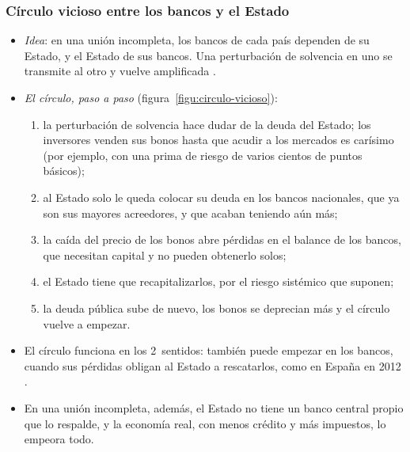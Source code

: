 \documentclass[11pt]{article}
\begin{document}
\subsubsection{Círculo vicioso entre los bancos y el Estado}\label{sec:circulo-vicioso}

\begin{itemize}
\item \emph{Idea}: en una unión incompleta, los bancos de cada país dependen de su Estado, y el Estado de sus bancos. Una perturbación de solvencia en uno se transmite al otro y vuelve amplificada .
\item \emph{El círculo, paso a paso} (figura~\ref{figu:circulo-vicioso}):
  \begin{enumerate}
  \item la perturbación de solvencia hace dudar de la deuda del Estado; los inversores venden sus bonos hasta que acudir a los mercados es carísimo (por ejemplo, con una prima de riesgo de varios cientos de puntos básicos);
  \item al Estado solo le queda colocar su deuda en los bancos nacionales, que ya son sus mayores acreedores, y que acaban teniendo aún más;
  \item la caída del precio de los bonos abre pérdidas en el balance de los bancos, que necesitan capital y no pueden obtenerlo solos;
  \item el Estado tiene que recapitalizarlos, por el riesgo sistémico que suponen;
  \item la deuda pública sube de nuevo, los bonos se deprecian más y el círculo vuelve a empezar.
  \end{enumerate}
\item El círculo funciona en los 2~sentidos: también puede empezar en los bancos, cuando sus pérdidas obligan al Estado a rescatarlos, como en España en 2012 .
\item En una unión incompleta, además, el Estado no tiene un banco central propio que lo respalde, y la economía real, con menos crédito y más impuestos, lo empeora todo.
\end{itemize}

\begin{infografia}[H]
\centering
\caption{El círculo vicioso entre los bancos y el Estado en una unión monetaria incompleta}\label{figu:circulo-vicioso}
\end{infografia}
\end{document}
